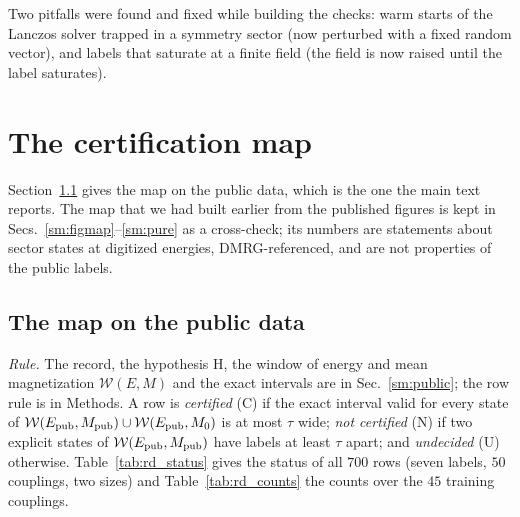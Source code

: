 \documentclass[aps,prx,onecolumn,10pt,nofootinbib,longbibliography,floatfix]{revtex4-2}
\theoremstyle{remark}
\newcommand{\W}{\mathcal{W}}
\begin{document}
\def\SMcap{Check T5: pinning matters. Lower extent $u_-$ (how far the label can be pushed down) at a fixed %
\emph{total} energy error $\epsilon$, for growing $n$. In the open chain, whose order is fixed by a single spin, $u_-$
grows with $n$ for $\epsilon\ge1$, like a local label (a domain wall is cheap); in the extensively pinned comb it %
falls with $n$ for $\epsilon\le2$ and is flat at $\epsilon=4$. Source: \texttt{paper/data/r3gen/out/t5\_defects.txt}, %
part (a).}\def\SMlab{tab:t5} %


Two pitfalls were found and fixed while building the checks: warm starts of the Lanczos solver trapped in a symmetry
sector (now perturbed with a fixed random vector), and labels that saturate at a finite field (the field is now raised
until the label saturates).

\section{The certification map}
\label{sm:map}

Section~\ref{sm:pubmap} gives the map on the public data, which is the one the main text reports. The map that we
had built earlier from the published figures is kept in Secs.~\ref{sm:figmap}--\ref{sm:pure} as a cross-check; its
numbers are statements about sector states at digitized energies, DMRG-referenced, and are not properties of the
public labels.

\subsection{The map on the public data}
\label{sm:pubmap}
\emph{Rule.} The record, the hypothesis H, the window of energy and mean magnetization $\W(E,M)$ and the exact
intervals are in Sec.~\ref{sm:public}; the row rule is in Methods. A row is \emph{certified} (C) if the exact interval
valid for every state of $\W(E_{\rm pub},M_{\rm pub})\cup\W(E_{\rm pub},M_0)$ is at most $\tau$ wide; \emph{not
certified} (N) if two explicit states of $\W(E_{\rm pub},M_{\rm pub})$ have labels at least $\tau$ apart; and
\emph{undecided} (U) otherwise. Table~\ref{tab:rd_status} gives the status of all $700$ rows (seven labels, $50$ %
couplings, two sizes) and Table~\ref{tab:rd_counts} the counts over the $45$ training couplings.
\end{document}
